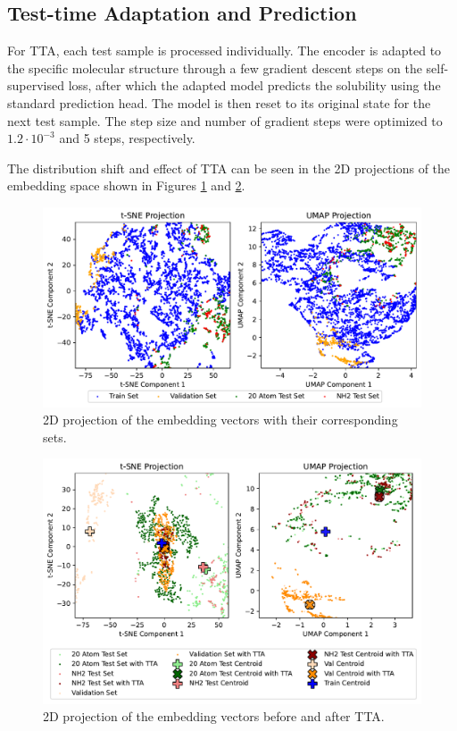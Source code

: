 \documentclass[11pt,a4paper]{article}
\begin{document}
\subsection{Test-time Adaptation and Prediction}

For TTA, each test sample is processed individually. The encoder is adapted to the specific molecular structure through a few gradient descent steps on the self-supervised loss, after which the adapted model predicts the solubility using the standard prediction head. The model is then reset to its original state for the next test sample. The step size and number of gradient steps were optimized to $1.2 \cdot 10^{-3}$ and 5 steps, respectively.

The distribution shift and effect of TTA can be seen in the 2D projections of the embedding space shown in Figures \ref{fig:sets} and \ref{fig:sets_TTA}.

\begin{figure}[htbp]
        \centering
        \includegraphics[width=1\textwidth]{sets.pdf}
        \caption{2D projection of the embedding vectors with their corresponding sets.}
        \label{fig:sets}
\end{figure}

\begin{figure}[htbp]
        \centering
        \includegraphics[width=1\textwidth]{sets_TTA.pdf}
        \caption{2D projection of the embedding vectors before and after TTA.}
        \label{fig:sets_TTA}
\end{figure}
\end{document}
